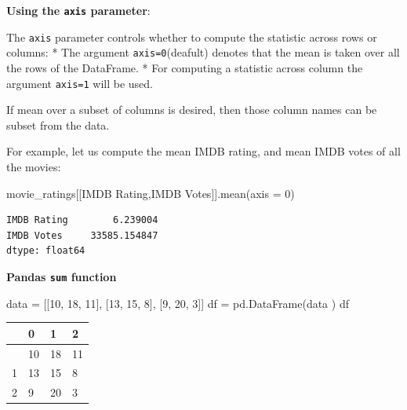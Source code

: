 \documentclass[
  letterpaper,
  DIV=11,
  numbers=noendperiod]{scrreprt}
\newenvironment{Shaded}{\begin{snugshade}}{\end{snugshade}}
\newcommand{\DecValTok}[1]{\textcolor[rgb]{0.68,0.00,0.00}{#1}}
\newcommand{\NormalTok}[1]{\textcolor[rgb]{0.00,0.23,0.31}{#1}}
\newcommand{\OperatorTok}[1]{\textcolor[rgb]{0.37,0.37,0.37}{#1}}
\newcommand{\StringTok}[1]{\textcolor[rgb]{0.13,0.47,0.30}{#1}}
\begin{document}
\textbf{Using the \texttt{axis} parameter}:

The \texttt{axis} parameter controls whether to compute the statistic
across rows or columns: * The argument \texttt{axis=0}(deafult) denotes
that the mean is taken over all the rows of the DataFrame. * For
computing a statistic across column the argument \texttt{axis=1} will be
used.

If mean over a subset of columns is desired, then those column names can
be subset from the data.

For example, let us compute the mean IMDB rating, and mean IMDB votes of
all the movies:

\begin{Shaded}
\begin{Highlighting}[]
\NormalTok{movie\_ratings[[}\StringTok{\textquotesingle{}IMDB Rating\textquotesingle{}}\NormalTok{,}\StringTok{\textquotesingle{}IMDB Votes\textquotesingle{}}\NormalTok{]].mean(axis }\OperatorTok{=} \DecValTok{0}\NormalTok{)}
\end{Highlighting}
\end{Shaded}

\begin{verbatim}
IMDB Rating        6.239004
IMDB Votes     33585.154847
dtype: float64
\end{verbatim}

\textbf{Pandas \texttt{sum} function}

\begin{Shaded}
\begin{Highlighting}[]
\NormalTok{data }\OperatorTok{=}\NormalTok{ [[}\DecValTok{10}\NormalTok{, }\DecValTok{18}\NormalTok{, }\DecValTok{11}\NormalTok{], [}\DecValTok{13}\NormalTok{, }\DecValTok{15}\NormalTok{, }\DecValTok{8}\NormalTok{], [}\DecValTok{9}\NormalTok{, }\DecValTok{20}\NormalTok{, }\DecValTok{3}\NormalTok{]]}
\NormalTok{df }\OperatorTok{=}\NormalTok{ pd.DataFrame(data )}
\NormalTok{df}
\end{Highlighting}
\end{Shaded}

\begin{longtable}[]{@{}llll@{}}
\toprule\noalign{}
& 0 & 1 & 2 \\
\midrule\noalign{}
\endhead
\bottomrule\noalign{}
\endlastfoot
0 & 10 & 18 & 11 \\
1 & 13 & 15 & 8 \\
2 & 9 & 20 & 3 \\
\end{longtable}
\end{document}
